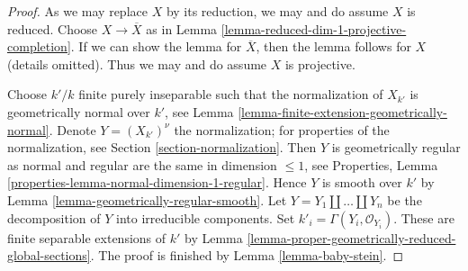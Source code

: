 \documentclass[10pt,a4paper]{amsart}
\theoremstyle{plain}
\theoremstyle{definition}
\theoremstyle{remark}
\numberwithin{equation}{subsection}
\begin{document}
\begin{proof}
As we may replace $X$ by its reduction, we may and do assume $X$ is reduced.
Choose $X \to \overline{X}$ as in
Lemma \ref{lemma-reduced-dim-1-projective-completion}.
If we can show the lemma for $\overline{X}$, then the lemma follows
for $X$ (details omitted).
Thus we may and do assume $X$ is projective.

\medskip\noindent
Choose $k'/k$ finite purely inseparable such that the normalization of
$X_{k'}$ is geometrically normal over $k'$, see
Lemma \ref{lemma-finite-extension-geometrically-normal}.
Denote $Y = (X_{k'})^\nu$ the normalization; for properties
of the normalization, see Section \ref{section-normalization}.
Then $Y$ is geometrically regular as normal and regular are the same
in dimension $\leq 1$, see
Properties, Lemma \ref{properties-lemma-normal-dimension-1-regular}.
Hence $Y$ is smooth over $k'$ by
Lemma \ref{lemma-geometrically-regular-smooth}.
Let $Y = Y_1 \amalg \ldots \amalg Y_n$ be the decomposition
of $Y$ into irreducible components.
Set $k'_i = \Gamma(Y_i, \mathcal{O}_{Y_i})$.
These are finite separable extensions of $k'$ by
Lemma \ref{lemma-proper-geometrically-reduced-global-sections}.
The proof is finished by Lemma \ref{lemma-baby-stein}.
\end{proof}
\end{document}
